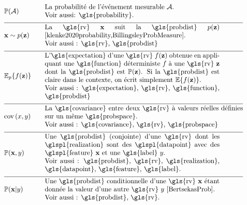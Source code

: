 \begin{align}
		&\prob{\mathcal{A}} &\quad & \parbox{.85\textwidth}{La probabilité de l'événement mesurable $\mathcal{A}$. 
		\\ Voir aussi: \gls{probability}.} \nonumber \\[2mm] \hline \nonumber\\[-5mm]
	&\featurevec \sim p(\vz) & \quad & \parbox{.75\textwidth}{
		La \gls{rv} $\featurevec$ suit la \gls{probdist} $p(\vz)$ \cite{klenke2020probability,BillingsleyProbMeasure}. \\
		Voir aussi : \gls{rv}, \gls{probdist}
	} \nonumber \\[2mm] \hline \nonumber\\[-5mm]    
	&\expect_{p} \{ f(\datapoint) \} & \quad & \parbox{.75\textwidth}{
		L'\gls{expectation} d'une \gls{rv} $f(\datapoint)$ obtenue en appliquant une \gls{function} déterministe $f$ à une \gls{rv} 
		$\datapoint$ dont la \gls{probdist} est $\prob{\datapoint}$. Si la \gls{probdist} est claire dans le contexte, 
		on écrit simplement $\expect \{ f(\datapoint) \}$. \\
		Voir aussi : \gls{expectation}, \gls{rv}, \gls{function}, \gls{probdist}
	} \nonumber \\[2mm] \hline \nonumber\\[-5mm]
	&\cov{x}{y} & \quad & \parbox{.85\textwidth}{
		La \gls{covariance} entre deux \gls{rv} à valeurs réelles définies 
		sur un même \gls{probspace}. \\
		Voir aussi : \gls{covariance}, \gls{rv}, \gls{probspace}
	} \nonumber \\[2mm] \hline \nonumber\\[-5mm]     
	&\prob{\featurevec,\truelabel} & \quad & \parbox{.75\textwidth}{
		Une \gls{probdist} (conjointe) d'une \gls{rv} 
		dont les \glspl{realization} sont des \glspl{datapoint} avec des \glspl{feature} $\featurevec$ et une \gls{label} $\truelabel$. \\
		Voir aussi : \gls{probdist}, \gls{rv}, \gls{realization}, \gls{datapoint}, \gls{feature}, 
		\gls{label}.} \nonumber \\[2mm] \hline \nonumber\\[-5mm]        
	&\prob{\featurevec|\truelabel} & \quad & \parbox{.75\textwidth}{
		Une \gls{probdist} conditionnelle d'une \gls{rv} 
		$\featurevec$ étant donnée la valeur d'une autre \gls{rv} $\truelabel$ \cite[Sec.\ 3.5]{BertsekasProb}. \\
		Voir aussi : \gls{probdist}, \gls{rv}.
	} \nonumber                                             
\end{align}

